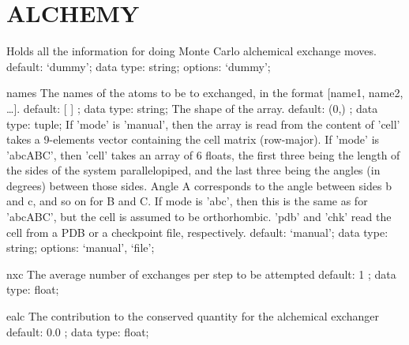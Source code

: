 \section{ALCHEMY}
\label{ALCHEMY}
\begin{ipifield}{}%
{Holds all the information for doing Monte Carlo alchemical exchange moves. }%
{}%
{%
{ }%
{default: `dummy'; data type: string; options: `dummy'; }%
}
\begin{ipifield}{names}%
{The names of the atoms to be to exchanged, in the format [name1, name2, \ldots  ].}%
{default:  [ ] ; data type: string; }%
{%
{The shape of the array.}%
{default:  (0,) ; data type: tuple; }%
%
{If 'mode' is 'manual', then the array is read from the content of 'cell' takes a 9-elements vector containing the cell matrix (row-major). If 'mode' is 'abcABC', then 'cell' takes an array of 6 floats, the first three being the length of the sides of the system parallelopiped, and the last three being the angles (in degrees) between those sides. Angle A corresponds to the angle between sides b and c, and so on for B and C. If mode is 'abc', then this is the same as for 'abcABC', but the cell is assumed to be orthorhombic. 'pdb' and 'chk' read the cell from a PDB or a checkpoint file, respectively.}%
{default: `manual'; data type: string; options: `manual', `file'; }%
}
\end{ipifield}
\begin{ipifield}{nxc}%
{The average number of exchanges per step to be attempted }%
{default:  1 ; data type: float; }%
{}
\end{ipifield}
\begin{ipifield}{ealc}%
{The contribution to the conserved quantity for the alchemical exchanger}%
{default:  0.0 ; data type: float; }%
{}
\end{ipifield}
\end{ipifield}
